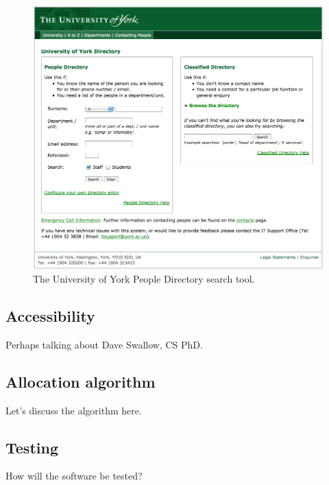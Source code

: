 \documentclass[]{scrartcl}
\begin{document}
\begin{figure}
  \begin{center}
    \includegraphics[width=160mm]{images/2011_11_06_yorkacuk_directory.png}
  \end{center}
  \caption{The University of York People Directory search tool.}
  \label{yorkacuk_directory_search}
\end{figure}


\subsection{Accessibility}

Perhaps talking about Dave Swallow, CS PhD.

\subsection{Allocation algorithm}

Let's discuss the algorithm here.

\subsection{Testing}

How will the software be tested?
\end{document}
